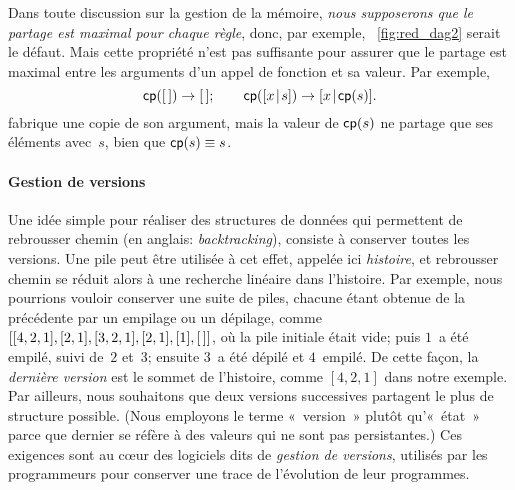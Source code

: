 
Dans toute discussion sur la gestion de la mémoire, \emph{nous
  supposerons que le partage est maximal pour chaque règle}, donc, par
exemple, \fig~\vref{fig:red_dag2} serait le défaut. Mais cette
propriété n'est pas suffisante pour assurer que le partage est maximal
entre les arguments d'un appel de fonction et sa valeur. Par exemple,
\begin{equation*}
\textsf{cp}([\,]) \rightarrow [\,];\qquad
\textsf{cp}([{x}\!\mid\!{s}]) \rightarrow [{x}\!\mid\!{\textsf{cp}(s)}].
\end{equation*}
fabrique une copie de son argument, mais la valeur de \(\textsf{cp}(s)\)
ne partage que ses éléments avec~\(s\), bien que \(\textsf{cp}(s) \equiv
s\).

\paragraph{Gestion de versions}

Une idée simple pour réaliser des structures de données qui permettent
de rebrousser chemin (en anglais: \emph{backtracking}), consiste à
conserver toutes les versions. Une pile peut être utilisée à cet effet, appelée ici
\emph{histoire}, et rebrousser chemin se
réduit alors à une recherche linéaire dans
l'histoire. Par exemple, nous pourrions vouloir conserver une suite de
piles, chacune étant obtenue de la précédente par un empilage ou un
dépilage, comme \([[4,2,1],[2,1],[3,2,1],[2,1],[1],[\,]]\), où la pile
initiale était vide; puis \(1\)~a été empilé, suivi de~\(2\) et~\(3\);
ensuite \(3\)~a été dépilé et \(4\)~empilé. De cette façon, la
\emph{dernière version} est le sommet de l'histoire, comme \([4,2,1]\)
dans notre exemple. Par ailleurs, nous souhaitons que deux versions
successives partagent le plus de structure possible. (Nous employons
le terme «~version~» plutôt qu'«~état~» parce que dernier se réfère à
des valeurs qui ne sont pas persistantes.) Ces exigences sont au
cœur des logiciels dits de \emph{gestion de versions}, utilisés
par les programmeurs pour conserver une trace de l'évolution de leur
programmes.

